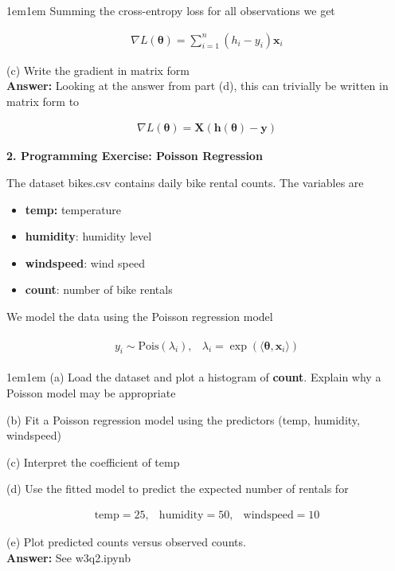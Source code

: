\documentclass[11pt]{article}
\begin{document}
\begin{adjustwidth}{1em}{1em}
        Summing the cross-entropy loss for all observations we get 

        \begin{align*}
            \nabla L(\boldsymbol{\theta}) = \sum_{i = 1}^n(h_i - y_i)\mathbf{x}_i
        \end{align*}

        (c) Write the gradient in matrix form \\ 

        \textbf{Answer:} Looking at the answer from part (d), this can trivially be written in
        matrix form to 

        \begin{align*}
            \nabla L(\boldsymbol{\theta}) = \mathbf{X}(\mathbf{h}(\boldsymbol{\theta}) - \mathbf{y})
        \end{align*}
    \end{adjustwidth}

    \newpage 
    \textbf{2. Programming Exercise: Poisson Regression}

    The dataset bikes.csv contains daily bike rental counts. The variables are

    \begin{itemize}
        \item \textbf{temp:} temperature
        \item \textbf{humidity}: humidity level
        \item \textbf{windspeed}: wind speed 
        \item \textbf{count}: number of bike rentals
    \end{itemize}

    We model the data using the Poisson regression model 

    \begin{align*}
        \begin{matrix}
            y_i \sim \text{Pois}(\lambda_i), 
            & \lambda_i = \exp(\langle \boldsymbol{\theta}, \mathbf{x}_i\rangle)
        \end{matrix}
    \end{align*}

    \begin{adjustwidth}{1em}{1em}
        (a) Load the dataset and plot a histogram of \textbf{count}. Explain why a Poisson model may
        be appropriate

        (b) Fit a Poisson regression model using the predictors (temp, humidity, windspeed)

        (c) Interpret the coefficient of temp 

        (d) Use the fitted model to predict the expected number of rentals for 

        \begin{align*}
            \text{temp} = 25,
            & \text{humidity} = 50,
            & \text{windspeed} = 10
        \end{align*}

        (e) Plot predicted counts versus observed counts. \\

        \textbf{Answer: } See w3q2.ipynb
    \end{adjustwidth}
\end{document}
